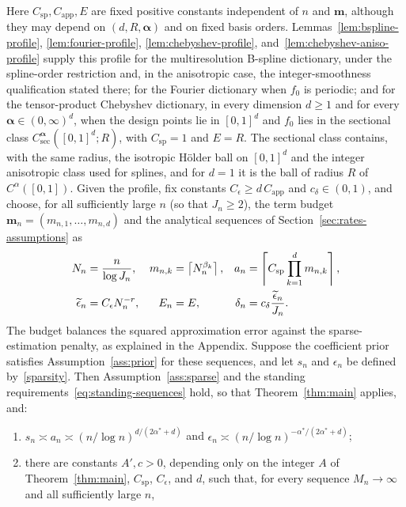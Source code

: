 \begin{corollary}{\thecorollary}
Here $C_{\mathrm{sp}},C_{\mathrm{app}},E$ are fixed positive constants independent of $n$ and $\boldsymbol m$, although they may depend on $(d,R,\boldsymbol\alpha)$ and on fixed basis orders. Lemmas~\ref{lem:bspline-profile}, \ref{lem:fourier-profile}, \ref{lem:chebyshev-profile}, and~\ref{lem:chebyshev-aniso-profile} supply this profile for the multiresolution B-spline dictionary, under the spline-order restriction and, in the anisotropic case, the integer-smoothness qualification stated there; for the Fourier dictionary when $f_0$ is periodic; and for the tensor-product Chebyshev dictionary, in every dimension $d\geq1$ and for every $\boldsymbol\alpha\in(0,\infty)^d$, when the design points lie in $[0,1]^d$ and $f_0$ lies in the sectional class $C^{\boldsymbol\alpha}_{\mathrm{sec}}([0,1]^d;R)$, with $C_{\mathrm{sp}}=1$ and $E=R$. The sectional class contains, with the same radius, the isotropic H\"older ball on $[0,1]^d$ and the integer anisotropic class used for splines, and for $d=1$ it is the ball of radius $R$ of $C^\alpha([0,1])$. Given the profile, fix constants $C_\epsilon\geq d\,C_{\mathrm{app}}$ and $c_\delta\in(0,1)$, and choose, for all sufficiently large $n$ (so that $J_n\geq2$), the term budget $\boldsymbol m_n=(m_{n,1},\ldots,m_{n,d})$ and the analytical sequences of Section~\ref{sec:rates-assumptions} as
\begin{align}
N_n&=\frac{n}{\log J_n},
&
m_{n,k}&=\left\lceil N_n^{\beta_k}\right\rceil,
&
a_n&=\left\lceil C_{\mathrm{sp}}\prod_{k=1}^dm_{n,k}\right\rceil, \label{eq:aniso-choice}\\
\widetilde{\epsilon}_n&=C_\epsilon N_n^{-r},
&
E_n&=E,
&
\delta_n&=c_\delta\frac{\widetilde{\epsilon}_n}{J_n}. \label{eq:aniso-prior-choice}
\end{align}
The budget balances the squared approximation error against the sparse-estimation penalty, as explained in the Appendix. Suppose the coefficient prior satisfies Assumption~\ref{ass:prior} for these sequences, and let $s_n$ and $\epsilon_n$ be defined by~\eqref{sparsity}. Then Assumption~\ref{ass:sparse} and the standing requirements~\eqref{eq:standing-sequences} hold, so that Theorem~\ref{thm:main} applies, and:
\begin{enumerate}[label=(\roman*)]
\item $s_n\asymp a_n\asymp(n/\log n)^{d/(2\alpha^*+d)}$ and $\epsilon_n\asymp(n/\log n)^{-\alpha^*/(2\alpha^*+d)}$;
\item\label{cor:anisotropic-tails} there are constants $A',c>0$, depending only on the integer $A$ of Theorem~\ref{thm:main}, $C_{\mathrm{sp}}$, $C_\epsilon$, and $d$, such that, for every sequence $M_n\to\infty$ and all sufficiently large $n$,

\end{enumerate}
\end{corollary}
